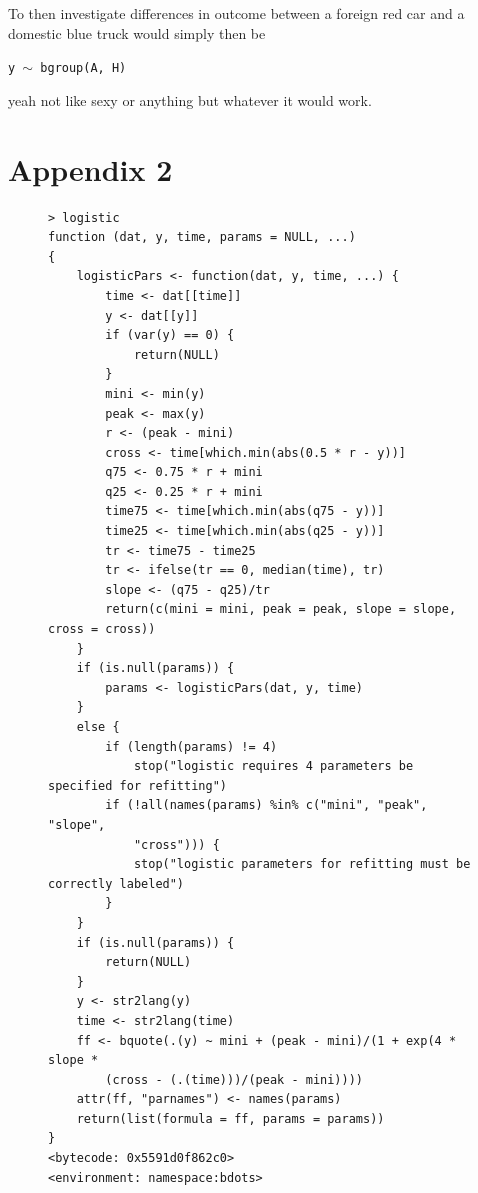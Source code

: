 \documentclass{article}
\begin{document}
To then investigate differences in outcome between a foreign red car and a domestic blue truck would simply then be

\begin{center}
\tt y $\sim$ bgroup(A, H)
\end{center}

yeah not like sexy or anything but whatever it would work.


\section{Appendix 2}


\begin{singlespace}
\begin{figure}[H]
\centering
\begin{BVerbatim}
> logistic
function (dat, y, time, params = NULL, ...) 
{
    logisticPars <- function(dat, y, time, ...) {
        time <- dat[[time]]
        y <- dat[[y]]
        if (var(y) == 0) {
            return(NULL)
        }
        mini <- min(y)
        peak <- max(y)
        r <- (peak - mini)
        cross <- time[which.min(abs(0.5 * r - y))]
        q75 <- 0.75 * r + mini
        q25 <- 0.25 * r + mini
        time75 <- time[which.min(abs(q75 - y))]
        time25 <- time[which.min(abs(q25 - y))]
        tr <- time75 - time25
        tr <- ifelse(tr == 0, median(time), tr)
        slope <- (q75 - q25)/tr
        return(c(mini = mini, peak = peak, slope = slope, cross = cross))
    }
    if (is.null(params)) {
        params <- logisticPars(dat, y, time)
    }
    else {
        if (length(params) != 4) 
            stop("logistic requires 4 parameters be specified for refitting")
        if (!all(names(params) %in% c("mini", "peak", "slope", 
            "cross"))) {
            stop("logistic parameters for refitting must be correctly labeled")
        }
    }
    if (is.null(params)) {
        return(NULL)
    }
    y <- str2lang(y)
    time <- str2lang(time)
    ff <- bquote(.(y) ~ mini + (peak - mini)/(1 + exp(4 * slope * 
        (cross - (.(time)))/(peak - mini))))
    attr(ff, "parnames") <- names(params)
    return(list(formula = ff, params = params))
}
<bytecode: 0x5591d0f862c0>
<environment: namespace:bdots>
\end{BVerbatim}
\end{figure}
\end{singlespace}
\end{document}
